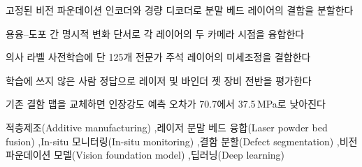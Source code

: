 \documentclass[preprint,12pt]{elsarticle}
\begin{document}
\begin{frontmatter}
\begin{highlights}
\item 고정된 비전 파운데이션 인코더와 경량 디코더로 분말 베드 레이어의
      결함을 분할한다
\item 용융--도포 간 명시적 변화 단서로 각 레이어의 두 카메라 시점을
      융합한다
\item 의사 라벨 사전학습에 단 125개 전문가 주석 레이어의 미세조정을
      결합한다
\item 학습에 쓰지 않은 사람 정답으로 레이저 및 바인더 젯 장비 전반을
      평가한다
\item 기존 결함 맵을 교체하면 인장강도 예측 오차가 70.7에서 37.5\,MPa로
      낮아진다
\end{highlights}

\begin{keyword}
적층제조(Additive manufacturing) \sep 레이저 분말 베드
융합(Laser powder bed fusion) \sep In-situ 모니터링(In-situ monitoring)
\sep 결함 분할(Defect segmentation) \sep 비전 파운데이션
모델(Vision foundation model) \sep 딥러닝(Deep learning)
\end{keyword}

\end{frontmatter}








\end{document}
